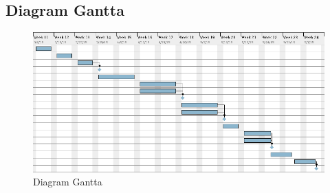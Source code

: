 \newpage
\subsection{Diagram Gantta}
\begin{figure}[H] 
 \begin{center}
  \includegraphics[width=\textwidth]{../harmonogram/gantt_uaktualniony.png}
 \end{center}
 \caption{Diagram Gantta}
 \label{fig:gantt}
\end{figure}
 